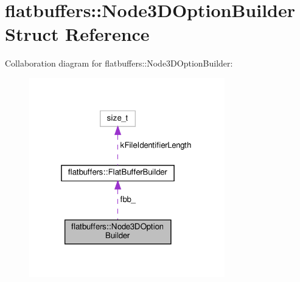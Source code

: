 \hypertarget{structflatbuffers_1_1Node3DOptionBuilder}{}\section{flatbuffers\+:\+:Node3\+D\+Option\+Builder Struct Reference}
\label{structflatbuffers_1_1Node3DOptionBuilder}


Collaboration diagram for flatbuffers\+:\+:Node3\+D\+Option\+Builder\+:
\nopagebreak
\begin{figure}[H]
\begin{center}
\leavevmode
\includegraphics[width=241pt]{structflatbuffers_1_1Node3DOptionBuilder__coll__graph}
\end{center}
\end{figure}
